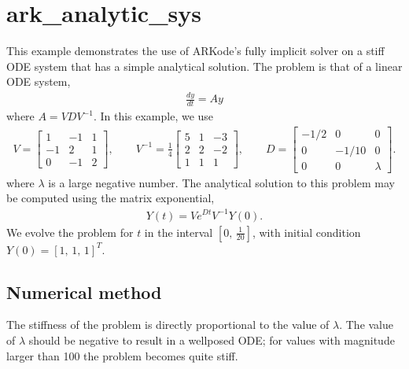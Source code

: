 \documentclass[letterpaper,10pt,english]{sphinxmanual}
\begin{document}
\section{ark\_analytic\_sys}
\label{\detokenize{cpp_serial:ark-analytic-sys}}\label{\detokenize{cpp_serial:id1}}
\sphinxAtStartPar
This example demonstrates the use of ARKode’s fully implicit solver on
a stiff ODE system that has a simple analytical solution.  The problem
is that of a linear ODE system,
\begin{equation*}
\begin{split}\frac{dy}{dt} = Ay\end{split}
\end{equation*}
\sphinxAtStartPar
where \(A = V D V^{-1}\).  In this example, we use
\begin{equation*}
\begin{split}V = \left[\begin{array}{rrr} 1 & -1 & 1\\ -1 & 2 & 1\\ 0 & -1 & 2
    \end{array}\right], \qquad
V^{-1} = \frac14 \left[\begin{array}{rrr} 5 & 1 & -3\\ 2 & 2 & -2\\
    1 & 1 & 1 \end{array}\right], \qquad
D = \left[\begin{array}{rrr} -1/2 & 0 & 0\\ 0 & -1/10 & 0\\ 0 & 0 &
    \lambda \end{array}\right].\end{split}
\end{equation*}
\sphinxAtStartPar
where \(\lambda\) is a large negative number. The analytical
solution to this problem may be computed using the matrix exponential,
\begin{equation*}
\begin{split}Y(t) = V e^{Dt} V^{-1} Y(0).\end{split}
\end{equation*}
\sphinxAtStartPar
We evolve the problem for \(t\) in the interval \(\left[0,\,
\frac{1}{20}\right]\), with initial condition \(Y(0) = \left[1,\,
1,\, 1\right]^T\).


\subsection{Numerical method}
\label{\detokenize{cpp_serial:numerical-method}}
\sphinxAtStartPar
The stiffness of the problem is directly proportional to the
value of \(\lambda\).  The value of \(\lambda\) should be
negative to result in a well\sphinxhyphen{}posed ODE; for values with magnitude
larger than 100 the problem becomes quite stiff.
\end{document}
